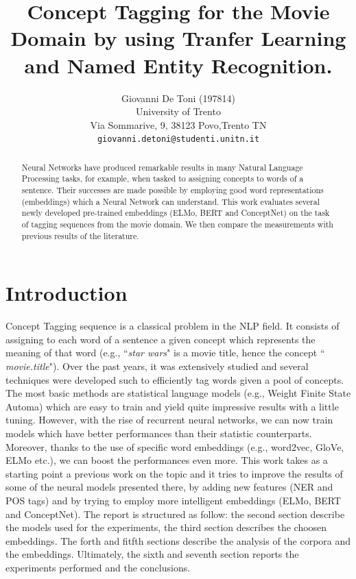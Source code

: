 \documentclass[11pt,a4paper]{article}
\title{Concept Tagging for the Movie Domain by using Tranfer Learning and Named Entity Recognition.}
\author{Giovanni De Toni (197814) \\
  University of Trento \\ Via Sommarive, 9, 38123 Povo,Trento TN\\
  \texttt{giovanni.detoni@studenti.unitn.it}}
\date{}
\begin{document}
\maketitle

\begin{abstract}
Neural Networks have produced remarkable results in many Natural Language Processing tasks, for example, when tasked to assigning concepts to words of a sentence. Their successes are made possible by employing good word representations (embeddings) which a Neural Network can understand. This work evaluates several newly developed pre-trained embeddings (ELMo, BERT and ConceptNet) on the task of tagging sequences from the movie domain. We then compare the measurements with previous results of the literature.
\end{abstract}

\section{Introduction}
Concept Tagging sequence is a classical problem in 
the NLP field. It consists of assigning to each word 
of a sentence a given concept which represents the 
meaning of that word (e.g., ``\textit{star wars}" is 
a movie title, hence the concept ``
\textit{movie.title}"). Over the past years, it was 
extensively studied and several techniques were 
developed such to efficiently tag words given a pool 
of concepts. The most basic methods are statistical 
language models (e.g., Weight Finite State Automa) 
which are easy to train and yield quite impressive 
results with a little tuning. However, with the rise 
of recurrent neural networks, we can now train 
models which have better performances than their 
statistic counterparts. Moreover, thanks to the use 
of specific word embeddings (e.g., word2vec, GloVe, 
ELMo etc.), we can boost the performances even more.
This work takes as a starting point a previous work 
on the topic \cite{gobbi} and it tries to improve 
the results of some of the neural models presented 
there, by adding new features (NER and POS tags) and 
by trying to employ more intelligent embeddings 
(ELMo, BERT and ConceptNet). The report is 
structured as follow: the second section describe 
the models used for the experiments, the third 
section describes the choosen embeddings. The forth 
and fitfth sections describe the analysis of the 
corpora and the embeddings. Ultimately,  the sixth 
and seventh section reports the experiments 
performed and the conclusions.  	
\end{document}
